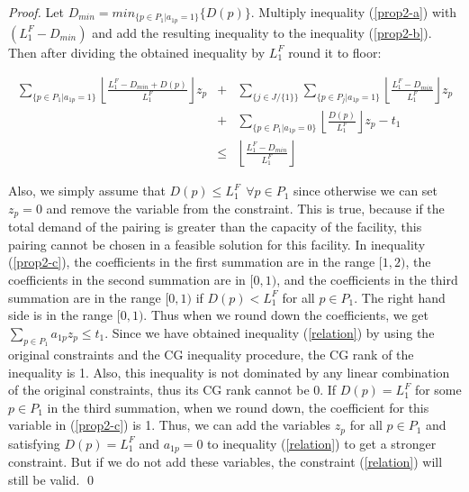 \begin{proof}
Let $D_{min} = min_{\{p \in P_1 | a_{1p}=1\}} \{ D(p) \}$. Multiply inequality (\ref{prop2-a}) 
with $(L^F_1-D_{min})$ and add the resulting inequality to the inequality (\ref{prop2-b}). 
Then after dividing the obtained inequality by $L^F_1$ round it to floor: 

\begin{eqnarray}
 \sum_{\{p \in P_1 | a_{1p}=1\}}  \left \lfloor \frac{L^F_1-D_{min}+D(p)}{L^F_1} \right \rfloor z_{p} &+&
    \sum_{\{j \in J / \{1\}\}}\sum_{\{p \in P_{j}|a_{1p}=1\}}\left \lfloor \frac{L^F_1-D_{min}}{L^F_1}\right \rfloor z_{p}\nonumber \\
     &+&\sum_{\{p \in P_1 | a_{1p}=0\}}\left \lfloor \frac{D(p)}{L^F_1}\right \rfloor z_{p} - t_1\nonumber \\
&\leq&  \left \lfloor \frac {L^F_1-D_{min}}{L^F_1}\right \rfloor  \label{prop2-c}
\end{eqnarray} 


Also, we simply assume that $D(p) \leq L^F_1 \ \ \forall p \in P_1$ since otherwise we can set
$z_{p}=0$ and remove the variable from the constraint. This is true, because if the
total demand of the pairing is greater than the capacity of the facility, this pairing
cannot be chosen in a feasible solution for this facility. In inequality (\ref{prop2-c}), 
the coefficients in the first summation are in the range $[1,2)$, the coefficients in the second 
summation are in $[0,1)$, and the coefficients in the third summation are in the range $[0,1)$ if 
$D(p)<L^F_1$ for all $p \in P_1$. The right hand side is in the range $[0,1)$. 
Thus when we round down the coefficients, we get $\sum_{p \in P_1} a_{1p} z_{p} \leq t_1$. 
Since we have obtained inequality (\ref{relation}) by using the original constraints and the 
CG inequality procedure, the CG rank of the inequality is 1. Also,  this inequality is not 
dominated by any linear combination of the original constraints, thus its CG rank cannot be 0. 
If $D(p)=L^F_1$ for some $p \in P_1$ in the third summation, when we round down, 
the coefficient for this variable in (\ref{prop2-c}) is 1. Thus, we can add the variables $z_p$ 
for all $p \in P_1$ and satisfying $D(p)=L^F_1$ and  $a_{1p}=0$ to inequality (\ref{relation}) 
to get a stronger constraint. But if we do not add these variables, the constraint (\ref{relation}) 
will still be valid. 
\qed
\end{proof}

